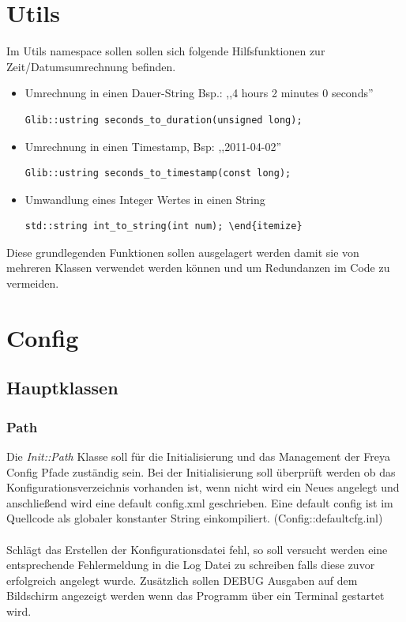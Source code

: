 
\section{Utils} 

Im Utils namespace sollen sollen sich folgende Hilfsfunktionen zur Zeit/Datumsumrechnung befinden.

\begin{itemize}
\item Umrechnung in einen Dauer-String Bsp.: ,,4 hours 2 minutes 0 seconds''

\begin{verbatim}
Glib::ustring seconds_to_duration(unsigned long);
\end{verbatim}

\item Umrechnung in einen Timestamp, Bsp: ,,2011-04-02''
\begin{verbatim}
Glib::ustring seconds_to_timestamp(const long);
\end{verbatim}

\item Umwandlung eines Integer Wertes in einen String
\begin{verbatim}
std::string int_to_string(int num); \end{itemize}
\end{verbatim}

\end{itemize}


Diese grundlegenden Funktionen sollen ausgelagert werden damit sie von mehreren Klassen verwendet werden können und um Redundanzen im 
Code zu vermeiden.


\section{Config}
\subsection{Hauptklassen}


\subsubsection{Path}
Die \emph{Init::Path} Klasse soll für die Initialisierung und das Management der Freya Config Pfade zuständig sein.
Bei der Initialisierung soll überprüft werden ob das Konfigurationsverzeichnis vorhanden ist, wenn nicht wird ein Neues
angelegt und anschließend wird eine default config.xml geschrieben. Eine default config ist im Quellcode als 
globaler konstanter String einkompiliert. (Config::defaultcfg.inl)
\\
\\
Schlägt das Erstellen der Konfigurationsdatei fehl, so soll versucht werden eine entsprechende Fehlermeldung in die Log Datei zu schreiben 
falls diese zuvor erfolgreich angelegt wurde. Zusätzlich sollen DEBUG Ausgaben auf dem Bildschirm angezeigt werden wenn das Programm
über ein Terminal gestartet wird.

